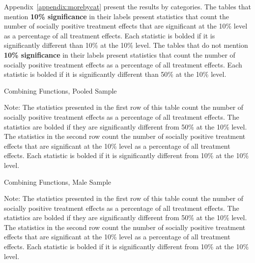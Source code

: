  Appendix~\ref{appendix:morebycat} present the results by categories. The tables that mention \textbf{10\% significance} in their labels present statistics that count the number of socially positive treatment effects that are significant at the 10\% level as a percentage of all treatment effects. Each statistic is bolded if it is significantly different than 10\% at the 10\% level. The tables that do not mention \textbf{10\% significance} in their labels present statistics that count the number of socially positive treatment effects as a percentage of all treatment effects. Each statistic is bolded if it is significantly different than 50\% at the 10\% level.


	\begin{table}[H]
	\begin{threeparttable}
     \caption{Combining Functions, Pooled Sample} 
     \label{table:abccare_rslt_pooled_counts_all}
	
	\begin{tablenotes}
	\footnotesize
	 Note: The statistics presented in the first row of this table count the number of socially positive 
	treatment effects as a percentage of all treatment effects. The statistics are bolded if they are 
	significantly different from 50\% at the 10\% level. The statistics in the second row count the
	number of socially positive treatment effects that are significant at the 10\% level as a percentage
	of all treatment effects. Each statistic is bolded if it is significantly different from 10\% at the 10\% 
	level.
	\end{tablenotes}
	\end{threeparttable}
	\end{table}  

	\begin{table}[H]
	\begin{threeparttable}
     \caption{Combining Functions, Male Sample} 
     \label{table:abccare_rslt_male_counts_all}
	
	\begin{tablenotes}
	\footnotesize
	 Note: The statistics presented in the first row of this table count the number of socially positive 
	treatment effects as a percentage of all treatment effects. The statistics are bolded if they are 
	significantly different from 50\% at the 10\% level. The statistics in the second row count the
	number of socially positive treatment effects that are significant at the 10\% level as a percentage
	of all treatment effects. Each statistic is bolded if it is significantly different from 10\% at the 10\% 
	level.
	\end{tablenotes}
	\end{threeparttable}
	\end{table}  

